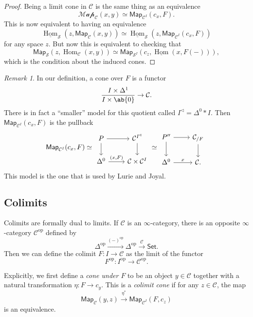 \documentclass[10pt, oneside]{memoir}
\theoremstyle{definition}
\theoremstyle{remark}
\newtheorem{rmk}[thm]{Remark}
\theoremstyle{plain}
\theoremstyle{definition}
\theoremstyle{remark}
\newcommand{\mc}[1]{\mathcal{#1}}
\newcommand{\ms}[1]{\mathsf{#1}}
\newcommand{\ul}[1]{\underline{#1}}
\newcommand{\1}{\mathbf{1}}
\newcommand{\2}{\mathbf{2}}
\newcommand{\3}{\mathbf{3}}
\DeclareMathOperator{\Hom}{Hom}
\DeclareMathOperator{\op}{op}
\begin{document}
\begin{proof}
    Being a limit cone in \(\mc{C} \) is the same thing as an equivalence
    \[ \mc{Map}_{\mc{C}}(x, y) \simeq \ms{Map}_{\mc{C}^I} (c_x, F). \]
    This is now equivalent to having an equivalence
    \[ \ul{\Hom}_{\mc{S}}(z, \ms{Map}_{\mc{C}}(x,y)) \simeq \ul{\Hom}_{\mc{S}}(z, \ms{Map}_{\mc{C}^I}(c_x, F)) \]
    for any space \(z \). But now this is equivalent to checking that
    \[ \ms{Map}_{\mc{S}}(z, \Hom_{\mc{C}}(x,y)) \simeq \ms{Map}_{\mc{S}^I} (c_z, \ul{\Hom}(x, F(-))), \]
    which is the condition about the induced cones.
\end{proof}

\begin{rmk}
    In our definition, a cone over \(F \) is a functor
    \[ \frac{I \times \Delta^1}{I \times \ab\{0\}} \to \mc{C}. \]
    There is in fact a ``smaller'' model for this quotient called \(I^{\triangleleft} = \Delta^0 * I \).
    Then \(\ms{Map}_{\mc{C}^I}(c_x, F) \) is the pullback
    \begin{equation*} \ms{Map}_{\mc{C}^I}(c_x, F) \simeq 
    \begin{tikzcd}
        P \ar{d} \ar{r} & \mc{C}^{I^{\triangleleft}} \ar{d} \\
        \Delta^0 \ar{r}{(x, F)} & \mc{C} \times \mc{C}^I 
    \end{tikzcd} \simeq
        \begin{tikzcd}
            P'' \ar{d} \ar{r} & \mc{C}_{/F} \ar{d} \\
            \Delta^0 \ar{r}{x} & \mc{C}.
        \end{tikzcd}
    \end{equation*}
    This model is the one that is used by Lurie and Joyal.
\end{rmk}


\subsection{Colimits}%
\label{sub:Colimits}

Colimits are formally dual to limits. If \(\mc{C} \) is an \(\infty \)-category, there is an opposite \(\infty \)-category \(\mc{C}^{\op} \) defined by
\[ \Delta^{\op} \xrightarrow{(-)^{\op}} \Delta^{\op} \xrightarrow{\mc{C}} \ms{Set}. \]
Then we can define the colimit \(F \colon I \to \mc{C} \) as the limit of the functor
\[ F^{\op} \colon I^{\op} \to \mc{C}^{\op}. \]

Explicitly, we first define a \textit{cone under \(F \)} to be an object \(y \in \mc{C} \) together with a natural transformation \(\eta \colon F \to c_y \). This is a \textit{colimit cone} if for any \(z \in \mc{C} \), the map
\[ \ms{Map}_{\mc{C}}(y, z) \xrightarrow{\eta^*} \ms{Map}_{\mc{C}^I} (F, c_z) \]
is an equivalence.
\end{document}
